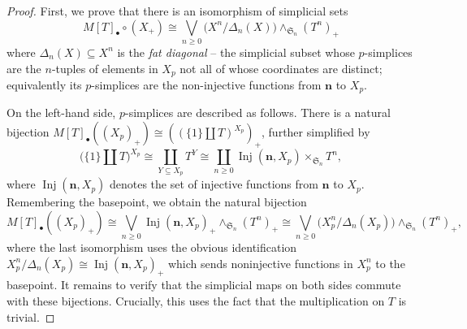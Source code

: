 \documentclass[12pt]{article}
\newcommand{\SymGroup}[1][n]{\mathfrak{S}_{#1}}
\theoremstyle{plain}
\theoremstyle{definition}
\theoremstyle{remark}
\begin{document}
\begin{proof}

First, we prove that there is an isomorphism of simplicial sets 
\[
    M[T]_{\bullet}\circ (X_+) \cong \bigvee_{n\geq 0}{\Big(X^n/{\Delta_n(X)}\Big) \wedge_{\SymGroup}(T^n)_+}
\]
where $\Delta_n(X) \subseteq X^n$ is the \emph{fat diagonal} -- the simplicial subset whose $p$-simplices are the $n$-tuples of elements in $X_p$ not all of whose coordinates are distinct; equivalently its $p$-simplices are the non-injective functions from $\bm{n}$ to $X_p$.%

On the left-hand side, $p$-simplices are described as follows. There is a natural bijection $M[T]_{\bullet}((X_p)_+) \cong \left((\{1\}\coprod T)^{X_p}\right)_+$, further simplified by
\begin{equation}\label{eq:from functor to configurations}
\big(\{1\}\coprod T\big)^{X_p} \cong \coprod_{Y\subseteq X_p} T^Y \cong \coprod_{n\geq 0}\operatorname{Inj}(\bm{n},X_p) \times_{\SymGroup} T^n,
\end{equation}
where $\operatorname{Inj}(\bm{n},X_p)$ denotes the set of injective functions from $\bm{n}$ to $X_p$. Remembering the basepoint, we obtain the natural bijection
\[
    M[T]_{\bullet}((X_p)_+) \cong \bigvee_{n\geq 0}\operatorname{Inj}(\bm{n},X_p)_+\wedge_{\SymGroup}(T^n)_+ \cong \bigvee_{n\geq 0}\Big(X_p^n/{\Delta_n(X_p)}\Big)\wedge_{\SymGroup}(T^n)_+,
\]
where the last isomorphism uses the obvious identification $X_p^n/\Delta_n(X_p) \cong \operatorname{Inj}(\bm{n},X_p)_+$
which sends noninjective functions in $X_p^n$ to the basepoint. It remains to verify that the simplicial maps on both sides commute with these bijections. Crucially, this uses the fact that the multiplication on $T$ is trivial.



\end{proof}
\end{document}
